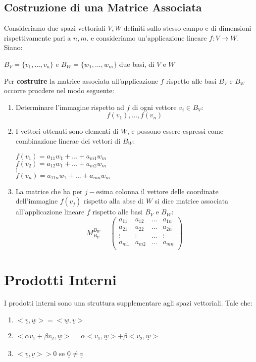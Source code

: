\subsection{Costruzione di una Matrice Associata}
Consideriamo due spazi vettoriali $V,W$ definiti sullo stesso campo e di dimensioni rispettivamente pari a $n,m$.
e consideriamo un'applicazione lineare $f:V\to W$.
\\Siano:
\begin{center}
	$B_V = \{v_1,...,v_n\}$ e $B_W=\{w_1,...,w_m\}$ due basi, di $V$ e $W$
\end{center}
Per \textbf{costruire} la matrice associata all'applicazione $f$ rispetto alle basi $B_V$ e $B_W$ occorre procdere nel modo seguente:
\begin{enumerate}
	\item Determinare l'immagine rispetto ad $f$ di ogni vettore $v_i \in B_V$:
	      \[ f(v_1),...,f(v_n)\]
	\item I vettori ottenuti sono elementi di $W$, e possono essere espressi come combinazione linerae dei vettori di $B_W$:
	\begin{center}
        $f(v_1) = a_{11}w_1 + ... + a_{m1}w_m $
        \\ $f(v_2) = a_{12}w_1 + ... + a_{m2}w_m $
        \\$ \vdots$
        \\$f(v_n) = a_{11n}w_1 + ... + a_{mn}w_m $
    \end{center}
    \item La matrice che ha per $j-$esima colonna il vettore delle coordinate dell'immagine $f(v_j)$ rispetto alla abse di $W$ si dice matrice associata all'applicazione lineare $f$ rispetto alle basi $B_V$ e $B_W$:
    \[ M_{B_V}^{B_W}			 = 
        \begin{pmatrix}
            a_{11} & a_{12} & ... & a_{1n} \\
            a_{21} & a_{22} & ... & a_{2n} \\
            \vdots & \vdots & ... & \vdots \\
            a_{m1} & a_{m2} & ... & a_{mn} \\
        \end{pmatrix}
    \]
\end{enumerate}

\section{Prodotti Interni} %
I prodotti interni sono una struttura supplementare agli spazi vettoriali.
Tale che:
\begin{enumerate}
	\item $<\underline{v},\underline{w}> = <\underline{w},\underline{v}>$
	\item $<\alpha \underline{v_1} + \beta \underline{v_2},\underline{w}> =\alpha <\underline{v_1},\underline{w}> + \beta <\underline{v_2},\underline{w}> $
	\item $<\underline{v},\underline{v}> > 0$ se $\underline{0}\neq \underline{v}$
\end{enumerate}